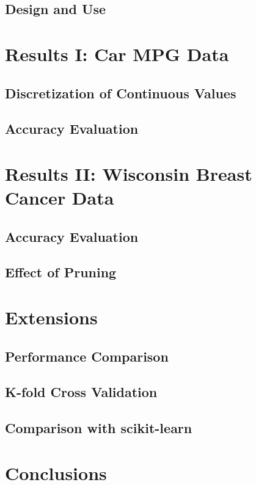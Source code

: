 \documentclass[12pt, conference, compsocconf]{IEEEtran}
\begin{document}
\subsection{Design and Use}

\section{Results I: Car MPG Data}

\subsection{Discretization of Continuous Values}

\subsection{Accuracy Evaluation}

\section{Results II: Wisconsin Breast Cancer Data}

\subsection{Accuracy Evaluation}

\subsection{Effect of Pruning}

\section{Extensions}

\subsection{Performance Comparison}

\subsection{K-fold Cross Validation}

\subsection{Comparison with scikit-learn}

\section{Conclusions}

%
%
\end{document}
